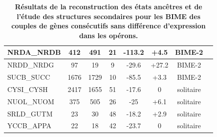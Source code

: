 \documentclass[12pt,a4paper]{report}
\begin{document}
\begin{table}[h!]
{\begin{tabular}{|l|c|c|c|c|c|c|c|}
  \hline
  NRDA\_NRDB & 412 & 491 & 21 & -113.2 & +4.5 & BIME-2\\
  \hline
  NRDD\_NRDG & 97 & 19 & 9 & -29.6 & +27.2 & BIME-2\\
  \hline  
  SUCB\_SUCC & 1676 & 1729 & 10 & -85.5 & +3.3 & BIME-2\\
  \hline
  CYSI\_CYSH & 2417 & 1655 & 51 & -17.6 & 0 & solitaire\\
  \hline  
  NUOL\_NUOM & 375 & 505 & 26 & -25 & +6.1 & solitaire\\
  \hline
  SRLD\_GUTM & 23 & 30 & 48 & -18.2 & +2.9 & solitaire\\
  \hline
  YCCB\_APPA & 22 & 18 & 42 & -23.7 & 0 & solitaire\\
  \hline
\end{tabular}
}
\caption{\textbf{Résultats de la reconstruction des états ancêtres et de l'étude des structures secondaires pour les BIME des couples de gènes consécutifs sans différence d'expression dans les opérons.} }
\end{table}
\end{document}
